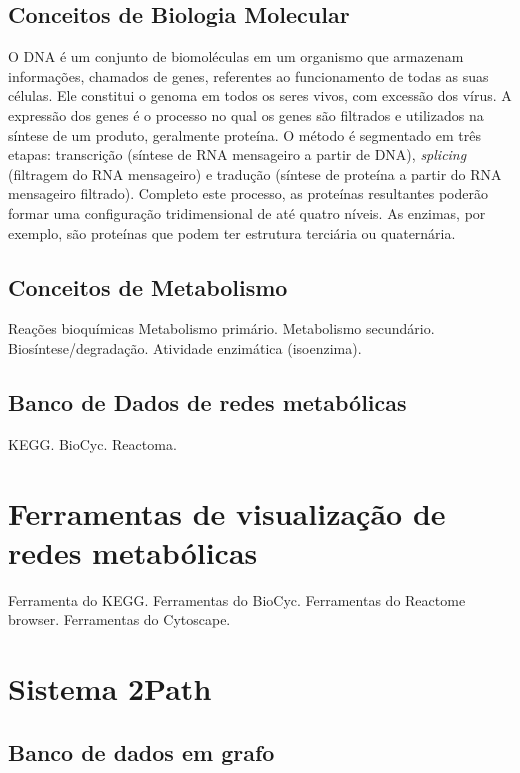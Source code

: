 \documentclass[conference]{IEEEtran}
\begin{document}
\subsection{Conceitos de Biologia Molecular}

O DNA é um conjunto de biomoléculas em um organismo que armazenam informações, chamados de genes, referentes ao funcionamento de todas as suas células. Ele constitui o genoma em todos os seres vivos, com excessão dos vírus. A expressão dos genes é o processo no qual os genes são filtrados e utilizados na síntese de um produto, geralmente proteína. O método é segmentado em três etapas: transcrição (síntese de RNA mensageiro a partir de DNA), \textit{splicing} (filtragem do RNA mensageiro) e tradução (síntese de proteína a partir do RNA mensageiro filtrado). Completo este processo, as proteínas resultantes poderão formar uma configuração tridimensional de até quatro níveis. As enzimas, por exemplo, são proteínas que podem ter estrutura terciária ou quaternária.

\subsection{Conceitos de Metabolismo}


Reações bioquímicas
Metabolismo primário. Metabolismo secundário. Biosíntese/degradação. 
Atividade enzimática (isoenzima).

\subsection{Banco de Dados de redes metabólicas}

KEGG. BioCyc. Reactoma.


\section{Ferramentas de visualização de redes metabólicas}

Ferramenta do KEGG. Ferramentas do BioCyc. Ferramentas do Reactome browser.
Ferramentas do Cytoscape.

\section{Sistema 2Path}

\subsection{Banco de dados em grafo}
\end{document}
